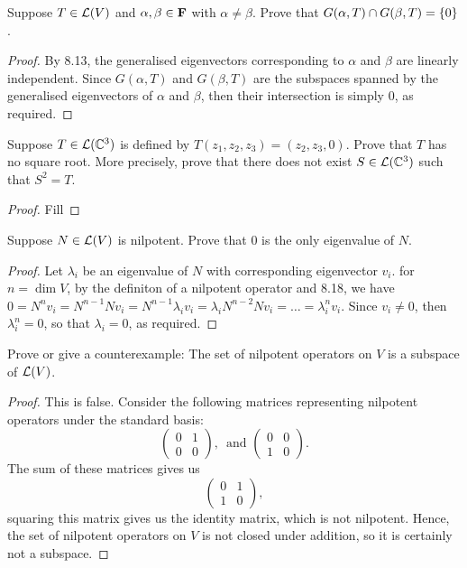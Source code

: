 \begin{exercise}{4}
  Suppose $T\in\mathcal{L}(V)$ and $\alpha,\beta\in\mathbf{F}$ with $\alpha\neq\beta$. Prove that $G(\alpha,T)\cap G(\beta,T)=\{0\}$.
\end{exercise}
\begin{proof}
 By 8.13, the generalised eigenvectors corresponding to $\alpha$ and $\beta$ are linearly independent. Since $G(\alpha, T)$ and $G(\beta, T)$ are the subspaces spanned by the generalised eigenvectors of $\alpha$ and $\beta$, then their intersection is simply 0, as required.
\end{proof}

\begin{exercise}{6}
  Suppose $T\in\mathcal{L}(\mathbb{C}^3)$ is defined by $T(z_1,z_2,z_3)=(z_2,z_3,0)$. Prove that $T$ has no square root. More precisely, prove that there does not exist $S\in\mathcal{L}(\mathbb{C}^3)$ such that $S^2=T$.
\end{exercise}
\begin{proof}
 Fill
\end{proof}

\begin{exercise}{7}
  Suppose $N\in\mathcal{L}(V)$ is nilpotent. Prove that 0 is the only eigenvalue of $N$.
\end{exercise}
\begin{proof}
 Let $\lambda_i$ be an eigenvalue of $N$ with corresponding eigenvector $v_i$. for $n=\dim V$, by the definiton of a nilpotent operator and 8.18, we have $0 =N^nv_i =N^{n-1}Nv_i =N^{n-1}\lambda_i v_i =\lambda_iN^{n-2}Nv_i =\dots =\lambda_i^n v_i$. Since $v_i\neq 0$, then $\lambda_i^n=0$, so that $\lambda_i=0$, as required.
\end{proof}

\begin{exercise}{8}
  Prove or give a counterexample: The set of nilpotent operators on $V$ is a subspace of $\mathcal{L}(V)$.
\end{exercise}
\begin{proof}
 This is false. Consider the following matrices representing nilpotent operators under the standard basis:
 \[
 \begin{pmatrix}
     0 & 1\\
     0 & 0
 \end{pmatrix},\,\text{ and }
 \begin{pmatrix}
     0 & 0\\
     1 & 0
 \end{pmatrix}.
 \]
 The sum of these matrices gives us
 \[
 \begin{pmatrix}
     0 & 1\\
     1 & 0
 \end{pmatrix},
 \]
 squaring this matrix gives us the identity matrix, which is not nilpotent. Hence, the set of nilpotent operators on $V$ is not closed under addition, so it is certainly not a subspace.
\end{proof}

